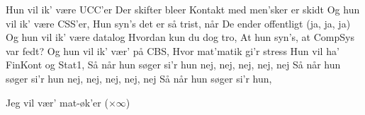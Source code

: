 \documentclass[a4paper,11pt]{article}
\begin{document}
\begin{song}
 Hun vil ik' være UCC'er
Der skifter bleer
Kontakt med men'sker er skidt
Og hun vil ik' være CSS'er,
Hun syn's det er så trist, når
De ender offentligt (ja, ja, ja)
Og hun vil ik' være datalog
Hvordan kun du dog tro,
At hun syn's, at CompSys var fedt?
Og hun vil ik' vær' på CBS,
Hvor mat'matik gi'r stress
Hun vil ha' FinKont og Stat1,
Så når hun søger si'r hun nej, nej, nej, nej, nej
Så når hun søger si'r hun nej, nej, nej, nej, nej
Så når hun søger si'r hun,

 Jeg vil vær' mat-øk'er ($\times\infty$)

\end{song}
\end{document}
